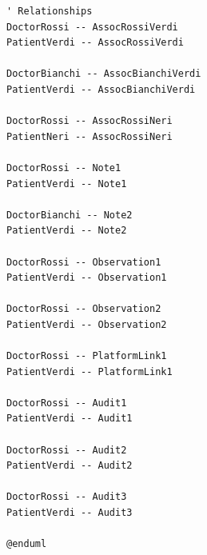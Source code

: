 \documentclass[12pt,a4paper,oneside]{report}
\begin{document}
\begin{lstlisting}[basicstyle=\small\ttfamily, breaklines=true]
' Relationships
DoctorRossi -- AssocRossiVerdi
PatientVerdi -- AssocRossiVerdi

DoctorBianchi -- AssocBianchiVerdi
PatientVerdi -- AssocBianchiVerdi

DoctorRossi -- AssocRossiNeri
PatientNeri -- AssocRossiNeri

DoctorRossi -- Note1
PatientVerdi -- Note1

DoctorBianchi -- Note2
PatientVerdi -- Note2

DoctorRossi -- Observation1
PatientVerdi -- Observation1

DoctorRossi -- Observation2
PatientVerdi -- Observation2

DoctorRossi -- PlatformLink1
PatientVerdi -- PlatformLink1

DoctorRossi -- Audit1
PatientVerdi -- Audit1

DoctorRossi -- Audit2
PatientVerdi -- Audit2

DoctorRossi -- Audit3
PatientVerdi -- Audit3

@enduml

\end{lstlisting}
\end{document}
